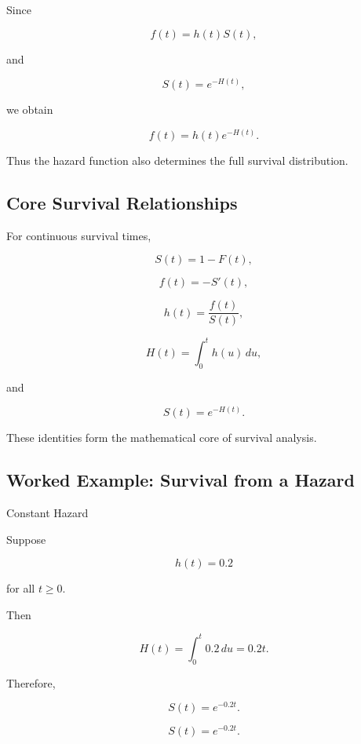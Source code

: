 Since

\[
f(t)
=
h(t)S(t),
\]

and

\[
S(t)
=
e^{-H(t)},
\]

we obtain

\[
\boxed{
f(t)
=
h(t)
e^{-H(t)}.
}
\]

Thus the hazard function also determines the full survival distribution.

\subsection{Core Survival Relationships}
\label{subsec:core-survival-relationships}

For continuous survival times,

\[
\boxed{
S(t)=1-F(t),
}
\]

\[
\boxed{
f(t)=-S'(t),
}
\]

\[
\boxed{
h(t)=\frac{f(t)}{S(t)},
}
\]

\[
\boxed{
H(t)=\int_0^t h(u)\,du,
}
\]

and

\[
\boxed{
S(t)=e^{-H(t)}.
}
\]

These identities form the mathematical core of survival analysis.

\subsection{Worked Example: Survival from a Hazard}
\label{subsec:worked-survival-from-hazard}

\begin{workedexamplebox}{Constant Hazard}

Suppose

\[
h(t)=0.2
\]

for all \(t\geq0\).

Then

\[
H(t)
=
\int_0^t0.2\,du
=
0.2t.
\]

Therefore,

\[
S(t)
=
e^{-0.2t}.
\]

\begin{answerbox}
\[
\boxed{
S(t)
=
e^{-0.2t}.
}
\]
\end{answerbox}

\end{workedexamplebox}

